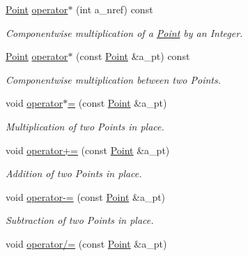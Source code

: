 \begin{DoxyCompactItemize}
\hyperlink{class_point}{Point} \hyperlink{class_point_a0e08b54dfb11c2c54907eb0b6aa54dae}{operator$\ast$} (int a\+\_\+nref) const
\begin{DoxyCompactList}\small\item\em Componentwise multiplication of a \hyperlink{class_point}{Point} by an Integer. \end{DoxyCompactList}\item 
\mbox{\label{class_point_a2db4fa18cb39589963aacca00636dbe5}} 
\hyperlink{class_point}{Point} \hyperlink{class_point_a2db4fa18cb39589963aacca00636dbe5}{operator$\ast$} (const \hyperlink{class_point}{Point} \&a\+\_\+pt) const
\begin{DoxyCompactList}\small\item\em Componentwise multiplication between two Points. \end{DoxyCompactList}\item 
\mbox{\label{class_point_ab7db9ac762d6637efcce56afc7750f1f}} 
void \hyperlink{class_point_ab7db9ac762d6637efcce56afc7750f1f}{operator$\ast$=} (const \hyperlink{class_point}{Point} \&a\+\_\+pt)
\begin{DoxyCompactList}\small\item\em Multiplication of two Points in place. \end{DoxyCompactList}\item 
\mbox{\label{class_point_a587465b64c61c24c7bcb9abf0dfda114}} 
void \hyperlink{class_point_a587465b64c61c24c7bcb9abf0dfda114}{operator+=} (const \hyperlink{class_point}{Point} \&a\+\_\+pt)
\begin{DoxyCompactList}\small\item\em Addition of two Points in place. \end{DoxyCompactList}\item 
\mbox{\label{class_point_a5c41a95bd50b076bdca75d920f73554f}} 
void \hyperlink{class_point_a5c41a95bd50b076bdca75d920f73554f}{operator-\/=} (const \hyperlink{class_point}{Point} \&a\+\_\+pt)
\begin{DoxyCompactList}\small\item\em Subtraction of two Points in place. \end{DoxyCompactList}\item 
void \hyperlink{class_point_a61672dab6c26441eac5aca9928cdfc1f}{operator/=} (const \hyperlink{class_point}{Point} \&a\+\_\+pt)

\end{DoxyCompactItemize}
